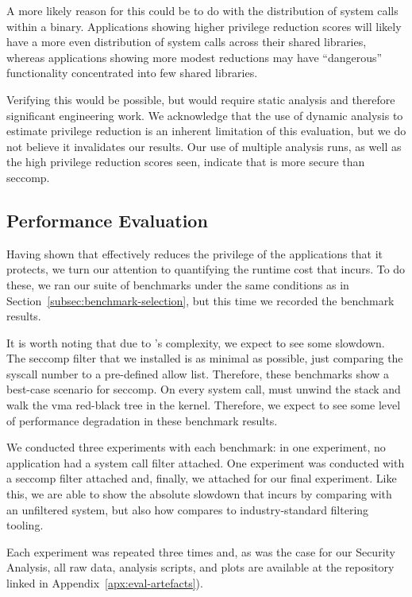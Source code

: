 A more likely reason for this could be to do with the distribution of system
calls within a binary. Applications showing higher privilege reduction scores
will likely have a more even distribution of system calls across their shared
libraries, whereas applications showing more modest reductions may have
``dangerous'' functionality concentrated into few shared libraries.

Verifying this would be possible, but would require static analysis and
therefore significant engineering work. We acknowledge that the use of dynamic
analysis to estimate privilege reduction is an inherent limitation of this
evaluation, but we do not believe it invalidates our results. Our use of
multiple analysis runs, as well as the high privilege reduction scores seen,
indicate that \af is more secure than seccomp. 

\subsection{Performance Evaluation}\label{subsec:perf-eval}

Having shown that \af effectively reduces the privilege of the applications that
it protects, we turn our attention to quantifying the runtime cost that \af
incurs. To do these, we ran our suite of benchmarks under the same
conditions as in Section~\ref{subsec:benchmark-selection}, but this time we
recorded the benchmark results. 

It is worth noting that due to \af's complexity, we expect to see some slowdown.
The seccomp filter that we installed is as minimal as possible, just comparing
the syscall number to a pre-defined allow list. Therefore, these benchmarks show
a best-case scenario for seccomp. On every system call, \af must unwind the
stack and walk the \ac{vma} red-black tree in the kernel. Therefore, we expect
to see some level of performance degradation in these benchmark results.

We conducted three experiments with each benchmark: in one experiment, no
application had a system call filter attached. One experiment was conducted with
a seccomp filter attached and, finally, we attached \af for our final
experiment. Like this, we are able to show the absolute slowdown that \af
incurs by comparing with an unfiltered system, but also how \af compares to
industry-standard filtering tooling.

Each experiment was repeated three times and, as was the case for our Security
Analysis, all raw data, analysis scripts, and plots are available at the
repository linked in Appendix~\ref{apx:eval-artefacts}).

